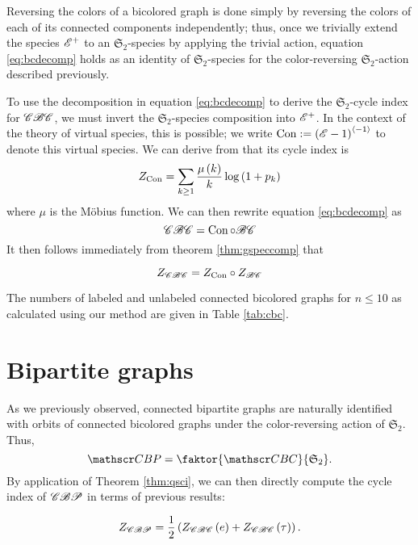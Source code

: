 \documentclass[sectionflow,singlespace,twoside,boldmathhdr]{brandiss} %
\numberwithin{section}{chapter}
\numberwithin{figure}{chapter}
\begin{document}
Reversing the colors of a bicolored graph is done simply by reversing the colors of each of its connected components independently; thus, once we trivially extend the species $\mathscr{E}^{+}$ to an $\mathfrak{S}_{2}$-species by applying the trivial action, equation \eqref{eq:bcdecomp} holds as an identity of $\mathfrak{S}_{2}$-species for the color-reversing $\mathfrak{S}_{2}$-action described previously.

To use the decomposition in equation \eqref{eq:bcdecomp} to derive the $\mathfrak{S}_{2}$-cycle index for $\mathscr{CBC}$, we must invert the $\mathfrak{S}_{2}$-species composition into $\mathscr{E}^{+}$.
In the context of the theory of virtual species, this is possible; we write $\operatorname{Con} := \left( {\mathscr{E} - 1} \right)^{\left\langle {-1} \right\rangle}$ to denote this virtual species.
We can derive from \cite[\S 2.5, eq.\ (58c)]{bll:species} that its cycle index is
\begin{equation}
  \label{eq:zgamma}
  Z_{\operatorname{Con}} = \sum_{k \geq 1} \frac{\mu \left( {k} \right)}{k} \log \left( {1 + p_{k}} \right)
\end{equation}
where $\mu$ is the M\"{o}bius function.
We can then rewrite equation \eqref{eq:bcdecomp} as
\[\mathscr{CBC} = \operatorname{Con} \circ \mathscr{BC}\]
It then follows immediately from theorem \ref{thm:gspeccomp} that
\begin{theorem}
  \begin{equation} Z_{\mathscr{CBC}} = Z_{\operatorname{Con}} \circ Z_{\mathscr{BC}} \label{eq:zcbcdecomp} \end{equation}
\end{theorem}

The numbers of labeled and unlabeled connected bicolored graphs for $n \leq 10$ as calculated using our method are given in Table \ref{tab:cbc}.

\section{Bipartite graphs}\label{s:bp}
As we previously observed, connected bipartite graphs are naturally identified with orbits of connected bicolored graphs under the color-reversing action of $\mathfrak{S}_{2}$.
Thus,
\begin{equation*}
  \specname{CBP} = \faktor{\specname{CBC}}{\mathfrak{S}_{2}}.
\end{equation*}
By application of Theorem \ref{thm:qsci}, we can then directly compute the cycle index of $\mathscr{CBP}$ in terms of previous results:
\begin{theorem}
  \begin{equation}
    Z_{\mathscr{CBP}} = \frac{1}{2} \left( {Z_{\mathscr{CBC}} \left( {e} \right) + Z_{\mathscr{CBC}} \left( {\tau} \right)} \right).
  \end{equation}
\end{theorem}
\end{document}
